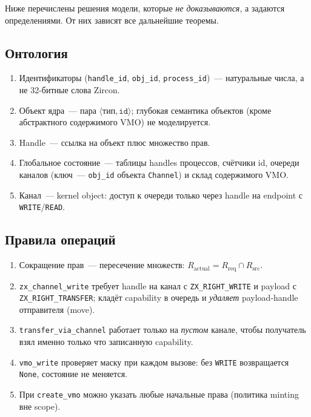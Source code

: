 \documentclass[11pt,a4paper]{article}
\begin{document}
Ниже перечислены решения модели, которые \emph{не доказываются}, а задаются
определениями. От них зависят все дальнейшие теоремы.

\subsection{Онтология}

\begin{enumerate}
  \item Идентификаторы (\texttt{handle\_id}, \texttt{obj\_id},
        \texttt{process\_id})~--- натуральные числа, а не
        32-битные слова Zircon.
  \item Объект ядра~--- пара $\langle\texttt{тип}, \texttt{id}\rangle$; глубокая
        семантика объектов (кроме абстрактного содержимого VMO) не моделируется.
  \item Handle~--- ссылка на объект плюс множество прав.
  \item Глобальное состояние~--- таблицы handles процессов, счётчики id,
        очереди каналов (ключ~--- \texttt{obj\_id} объекта
        \texttt{Channel}) и склад содержимого VMO.
  \item Канал~--- kernel object: доступ к очереди только через handle на
        endpoint с \texttt{WRITE}/\texttt{READ}.
\end{enumerate}

\subsection{Правила операций}

\begin{enumerate}
  \item Сокращение прав~--- пересечение множеств:
        $R_{\mathrm{actual}} = R_{\mathrm{req}} \cap R_{\mathrm{src}}$.
  \item \texttt{zx\_channel\_write} требует handle на канал с
        \texttt{ZX\_RIGHT\_WRITE} и payload с \texttt{ZX\_RIGHT\_TRANSFER};
        кладёт capability в очередь и \emph{удаляет} payload-handle
        отправителя (move).
  \item \texttt{transfer\_via\_channel} работает только на \emph{пустом}
        канале, чтобы получатель взял именно только что записанную capability.
  \item \texttt{vmo\_write} проверяет маску при каждом вызове: без
        \texttt{WRITE} возвращается \texttt{None}, состояние не меняется.
  \item При \texttt{create\_vmo} можно указать любые начальные права
        (политика minting вне scope).
\end{enumerate}
\end{document}

